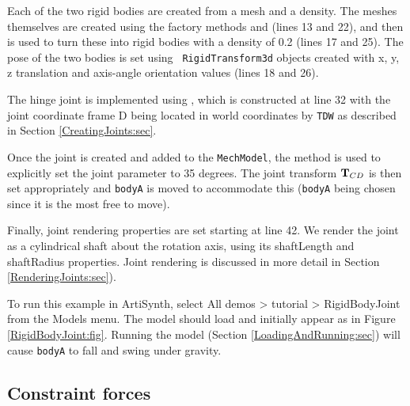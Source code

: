 Each of the two rigid bodies are created from a mesh and a density.
The meshes themselves are created using the factory methods
 and
(lines 13 and 22), and then
 is
used to turn these into rigid bodies with a density of 0.2 (lines 17
and 25). The pose of the two bodies is set using {\tt
RigidTransform3d} objects created with x, y, z translation and
axis-angle orientation values (lines 18 and 26).

The hinge joint is implemented using
, which is
constructed at line 32 with the joint coordinate frame D being located
in world coordinates by {\tt TDW} 
as described in Section \ref{CreatingJoints:sec}.

Once the joint is created and added to the {\tt MechModel}, the method
 is
used to explicitly set the joint parameter to 35 degrees. The joint
transform ${\bf T}_{CD}$ is then set appropriately and {\tt bodyA} is moved
to accommodate this ({\tt bodyA} being chosen since it is the most
free to move).

Finally, joint rendering properties are set starting at line 42. We
render the joint as a cylindrical shaft about the rotation axis, using
its {\sf shaftLength} and {\sf shaftRadius} properties. Joint
rendering is discussed in more detail in
Section \ref{RenderingJoints:sec}).

To run this example in ArtiSynth, select {\sf All demos > tutorial >
RigidBodyJoint} from the {\sf Models} menu. The model should load and
initially appear as in Figure \ref{RigidBodyJoint:fig}.  Running the
model (Section \ref{LoadingAndRunning:sec}) will cause {\tt bodyA} to
fall and swing under gravity.

\subsection{Constraint forces}

